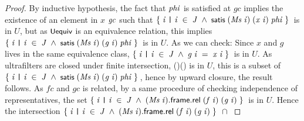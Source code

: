 \documentclass[letterpaper]{article}
\renewcommand{\HOLConst}[1]{{\textsf{\upshape\small #1}}}
\renewcommand{\HOLinline}[1]{\ensuremath{#1}}
\begin{document}
\begin{proof}
By inductive hypothesis, the fact that \HOLinline{\HOLFreeVar{phi}} is satisfied at $gc$ implies the existence of an element in $x$ \HOLinline{\HOLFreeVar{gc}} such that \HOLinline{\HOLTokenLeftbrace{}\HOLBoundVar{i}\;\HOLTokenBar{}\;\HOLBoundVar{i}\;\HOLSymConst{\HOLTokenIn{}}\;\HOLFreeVar{J}\;\HOLSymConst{\HOLTokenConj{}}\;\HOLConst{satis}\;(\HOLFreeVar{Ms}\;\HOLBoundVar{i})\;(\HOLFreeVar{x}\;\HOLBoundVar{i})\;\HOLFreeVar{phi}\HOLTokenRightbrace{}} is in $U$, but as \HOLinline{\HOLConst{Uequiv}} is an equivalence relation, this implies \HOLinline{\HOLTokenLeftbrace{}\HOLBoundVar{i}\;\HOLTokenBar{}\;\HOLBoundVar{i}\;\HOLSymConst{\HOLTokenIn{}}\;\HOLFreeVar{J}\;\HOLSymConst{\HOLTokenConj{}}\;\HOLConst{satis}\;(\HOLFreeVar{Ms}\;\HOLBoundVar{i})\;(\HOLFreeVar{g}\;\HOLBoundVar{i})\;\HOLFreeVar{phi}\HOLTokenRightbrace{}} is in $U$. As we can check: Since $x$ and $g$ lives in the same equivalence class, \HOLinline{\HOLTokenLeftbrace{}\HOLBoundVar{i}\;\HOLTokenBar{}\;\HOLBoundVar{i}\;\HOLSymConst{\HOLTokenIn{}}\;\HOLFreeVar{J}\;\HOLSymConst{\HOLTokenConj{}}\;\HOLFreeVar{g}\;\HOLBoundVar{i}\;\HOLSymConst{=}\;\HOLFreeVar{x}\;\HOLBoundVar{i}\HOLTokenRightbrace{}} is in $U$. As ultrafilters are closed under finite intersection, \HOLTokenLeftbrace{}\;\HOLTokenBar{}\;\;\HOLSymConst{\HOLTokenIn{}}\;\;\HOLSymConst{\HOLTokenConj{}}\;\;\;\HOLSymConst{=}\;\;\HOLTokenRightbrace{}\;\HOLSymConst{\HOLTokenInter{}}\;\HOLTokenLeftbrace{}\;\HOLTokenBar{}\;\;\HOLSymConst{\HOLTokenIn{}}\;\;\HOLSymConst{\HOLTokenConj{}}\;\HOLConst{satis}\;(\;)\;(\;)\;\HOLTokenRightbrace{} is in $U$, this is a subset of  \HOLinline{\HOLTokenLeftbrace{}\HOLBoundVar{i}\;\HOLTokenBar{}\;\HOLBoundVar{i}\;\HOLSymConst{\HOLTokenIn{}}\;\HOLFreeVar{J}\;\HOLSymConst{\HOLTokenConj{}}\;\HOLConst{satis}\;(\HOLFreeVar{Ms}\;\HOLBoundVar{i})\;(\HOLFreeVar{g}\;\HOLBoundVar{i})\;\HOLFreeVar{phi}\HOLTokenRightbrace{}}, hence by upward closure, the result follows. As $fc$ and $gc$ is related, by a same procedure of checking independence of representatives, the set \HOLinline{\HOLTokenLeftbrace{}\HOLBoundVar{i}\;\HOLTokenBar{}\;\HOLBoundVar{i}\;\HOLSymConst{\HOLTokenIn{}}\;\HOLFreeVar{J}\;\HOLSymConst{\HOLTokenConj{}}\;(\HOLFreeVar{Ms}\;\HOLBoundVar{i}).\HOLFieldName{frame}.\HOLFieldName{rel}\;(\HOLFreeVar{f}\;\HOLBoundVar{i})\;(\HOLFreeVar{g}\;\HOLBoundVar{i})\HOLTokenRightbrace{}} is in $U$. Hence the intersection \HOLinline{\HOLTokenLeftbrace{}\HOLBoundVar{i}\;\HOLTokenBar{}\;\HOLBoundVar{i}\;\HOLSymConst{\HOLTokenIn{}}\;\HOLFreeVar{J}\;\HOLSymConst{\HOLTokenConj{}}\;(\HOLFreeVar{Ms}\;\HOLBoundVar{i}).\HOLFieldName{frame}.\HOLFieldName{rel}\;(\HOLFreeVar{f}\;\HOLBoundVar{i})\;(\HOLFreeVar{g}\;\HOLBoundVar{i})\HOLTokenRightbrace{}\;\HOLSymConst{\HOLTokenInter{}}\\
}
\end{proof}
\end{document}
